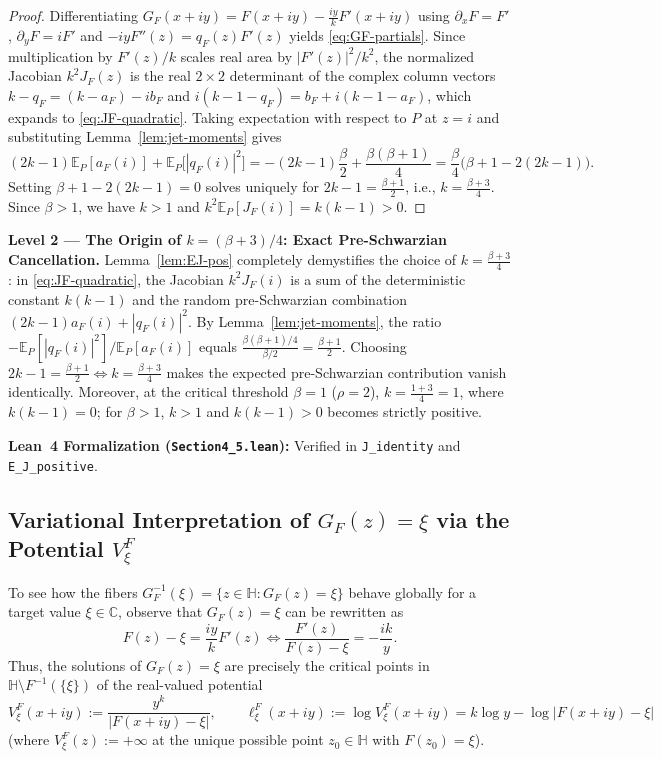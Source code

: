 \documentclass[12pt]{article}
\def\C{\mathbb{C}}
\def\H{\mathbb{H}}
\def\E{\mathbb{E}}
\theoremstyle{definition}
\numberwithin{equation}{section}
\begin{document}
\begin{proof}
Differentiating $G_F(x+iy) = F(x+iy) - \frac{iy}{k}F'(x+iy)$ using $\partial_x F = F'$, $\partial_y F = iF'$ and $-iy F''(z) = q_F(z) F'(z)$ yields \eqref{eq:GF-partials}. Since multiplication by $F'(z)/k$ scales real area by $|F'(z)|^2 / k^2$, the normalized Jacobian $k^2 J_F(z)$ is the real $2\times 2$ determinant of the complex column vectors $k - q_F = (k - a_F) - i b_F$ and $i(k - 1 - q_F) = b_F + i(k - 1 - a_F)$, which expands to \eqref{eq:JF-quadratic}. Taking expectation with respect to $P$ at $z = i$ and substituting Lemma~\ref{lem:jet-moments} gives
\[
  (2k - 1)\E_P[a_F(i)] + \E_P\Big[|q_F(i)|^2\Big] = -(2k - 1)\frac{\beta}{2} + \frac{\beta(\beta + 1)}{4} = \frac{\beta}{4}\Big(\beta + 1 - 2(2k - 1)\Big).
\]
Setting $\beta + 1 - 2(2k - 1) = 0$ solves uniquely for $2k - 1 = \frac{\beta+1}{2}$, i.e., $k = \frac{\beta+3}{4}$. Since $\beta > 1$, we have $k > 1$ and $k^2 \E_P[J_F(i)] = k(k - 1) > 0$.
\end{proof}

\begin{leveltwo}
\noindent\textbf{\textcolor{l2border}{Level 2 --- The Origin of $k = (\beta+3)/4$: Exact Pre-Schwarzian Cancellation.}}
Lemma~\ref{lem:EJ-pos} completely demystifies the choice of $k = \frac{\beta+3}{4}$: in \eqref{eq:JF-quadratic}, the Jacobian $k^2 J_F(i)$ is a sum of the deterministic constant $k(k-1)$ and the random pre-Schwarzian combination $(2k-1)a_F(i) + |q_F(i)|^2$. By Lemma~\ref{lem:jet-moments}, the ratio $-\E_P[|q_F(i)|^2] / \E_P[a_F(i)]$ equals $\frac{\beta(\beta+1)/4}{\beta/2} = \frac{\beta+1}{2}$. Choosing $2k - 1 = \frac{\beta+1}{2} \iff k = \frac{\beta+3}{4}$ makes the expected pre-Schwarzian contribution vanish identically. Moreover, at the critical threshold $\beta = 1$ ($\rho = 2$), $k = \frac{1+3}{4} = 1$, where $k(k-1) = 0$; for $\beta > 1$, $k > 1$ and $k(k-1) > 0$ becomes strictly positive.

\smallskip
\noindent\textbf{\textcolor{leannote}{Lean~4 Formalization (\texttt{Section4\_5.lean}):}} Verified in \texttt{J\_identity} and \texttt{E\_J\_positive}.
\end{leveltwo}

\subsection{Variational Interpretation of $G_F(z) = \xi$ via the Potential $V_\xi^F$}

To see how the fibers $G_F^{-1}(\xi) = \{z \in \H : G_F(z) = \xi\}$ behave globally for a target value $\xi \in \C$, observe that $G_F(z) = \xi$ can be rewritten as
\[
  F(z) - \xi = \frac{iy}{k} F'(z) \iff \frac{F'(z)}{F(z) - \xi} = -\frac{ik}{y}.
\]
Thus, the solutions of $G_F(z) = \xi$ are precisely the critical points in $\H \setminus F^{-1}(\{\xi\})$ of the real-valued potential
\begin{equation}\label{eq:V-target-def}
  V_\xi^F(x + iy) := \frac{y^k}{|F(x + iy) - \xi|}, \qquad \ell_\xi^F(x + iy) := \log V_\xi^F(x + iy) = k \log y - \log |F(x + iy) - \xi|
\end{equation}
(where $V_\xi^F(z) := +\infty$ at the unique possible point $z_0 \in \H$ with $F(z_0) = \xi$).
\end{document}
